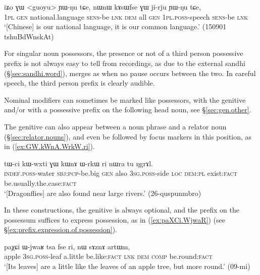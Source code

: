 \begin{exe}
\ex \label{ex:iZo.GW.guoyu}
\gll iʑo ɣɯ <guoyu> ɲɯ-ŋu tɕe, nɯnɯ kɤsɯfse ɣɯ ji-rju ɲɯ-ŋu tɕe, \\
\textsc{1pl} \textsc{gen} national.language \textsc{sens}-be \textsc{lnk} \textsc{dem} all \textsc{gen} \textsc{1pl}.\textsc{poss}-speech \textsc{sens}-be \textsc{lnk} \\
\glt `[Chinese] is our national language, it is our common language.' (150901 tshuBdWnskAt) 
\end{exe}

For singular noun possessors, the presence or not of a third person possessive prefix  is not always easy to tell from recordings, as due to the external sandhi (§\ref{sec:sandhi.word}),  merges as  when no pause occurs between the two. In careful speech, the third person prefix is clearly audible.

Nominal modifiers can sometimes be marked like possessors, with the genitive and/or with a possessive prefix on the following head noun, see §\ref{sec:gen.other}. 

The genitive can also appear between a noun phrase and a relator noun (§\ref{sec:relator.nouns}), and even be followed by focus markers in this position, as in (\ref{ex:GW.kWnA.WrkW.ri}).

\begin{exe}
\ex \label{ex:GW.kWnA.WrkW.ri}
\gll   tɯ-ci kɯ-wxti ɣɯ kɯnɤ ɯ-rkɯ ri nɯra tu ŋgrɤl.  \\
\textsc{indef}.\textsc{poss}-water \textsc{sbj}:\textsc{pcp}-be.big \textsc{gen} also \textsc{3sg}.\textsc{poss}-side \textsc{loc} \textsc{dem}:\textsc{pl} exist:\textsc{fact} be.usually.the.case:\textsc{fact} \\
\glt `[Dragonflies] are also found near large rivers.' (26-quspunmbro)
\end{exe}

In these constructions, the genitive is always optional, and the prefix on the possessum suffices to express possession, as in (\ref{ex:paXCi.WjwaR}) (see §\ref{ex:prefix.expression.of.possession}).

\begin{exe}
\ex \label{ex:paXCi.WjwaR}
\gll paχɕi ɯ-jwaʁ tsa fse ri, nɯ sɤznɤ artɯm,\\
apple \textsc{3sg}.\textsc{poss}-leaf a.little be.like:\textsc{fact} \textsc{lnk} \textsc{dem} \textsc{comp} be.round:\textsc{fact} \\
\glt `[Its leaves] are a little like the leaves of an apple tree, but more round.' (09-mi)
\end{exe}

